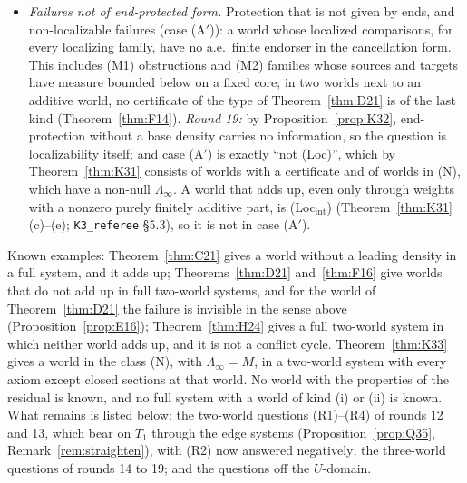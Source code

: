 \documentclass[11pt]{article}
\theoremstyle{definition}
\theoremstyle{remark}
\newcommand{\src}[1]{\texttt{#1}}
\begin{document}
\begin{itemize}[leftmargin=*]
\item \emph{Failures not of end-protected form.} Protection that is not given by ends, and non-localizable failures (case (A$'$)): a world whose localized comparisons, for every localizing family, have no a.e.\ finite endorser in the cancellation form. This includes (M1) obstructions and (M2) families whose sources and targets have measure bounded below on a fixed core; in two worlds next to an additive world, no certificate of the type of Theorem~\ref{thm:D21} is of the last kind (Theorem~\ref{thm:F14}). \emph{Round 19:} by Proposition~\ref{prop:K32}, end-protection without a base density carries no information, so the question is localizability itself; and case (A$'$) is exactly ``not (Loc)'', which by Theorem~\ref{thm:K31} consists of worlds with a certificate and of worlds in (N), which have a non-null $\Lambda_\infty$. A world that adds up, even only through weights with a nonzero purely finitely additive part, is (Loc$_{\mathrm{int}}$) (Theorem~\ref{thm:K31}(c)--(e); \src{K3\_referee} \S5.3), so it is not in case (A$'$).
\end{itemize}
Known examples: Theorem~\ref{thm:C21} gives a world without a leading density in a full system, and it adds up; Theorems~\ref{thm:D21} and~\ref{thm:F16} give worlds that do not add up in full two-world systems, and for the world of Theorem~\ref{thm:D21} the failure is invisible in the sense above (Proposition~\ref{prop:E16}); Theorem~\ref{thm:H24} gives a full two-world system in which neither world adds up, and it is not a conflict cycle. Theorem~\ref{thm:K33} gives a world in the class (N), with $\Lambda_\infty=M$, in a two-world system with every axiom except closed sections at that world. No world with the properties of the residual is known, and no full system with a world of kind (i) or (ii) is known. What remains is listed below: the two-world questions (R1)--(R4) of rounds 12 and 13, which bear on $T_1$ through the edge systems (Proposition~\ref{prop:Q35}, Remark~\ref{rem:straighten}), with (R2) now answered negatively; the three-world questions of rounds 14 to 19; and the questions off the $U$-domain.
\end{document}
